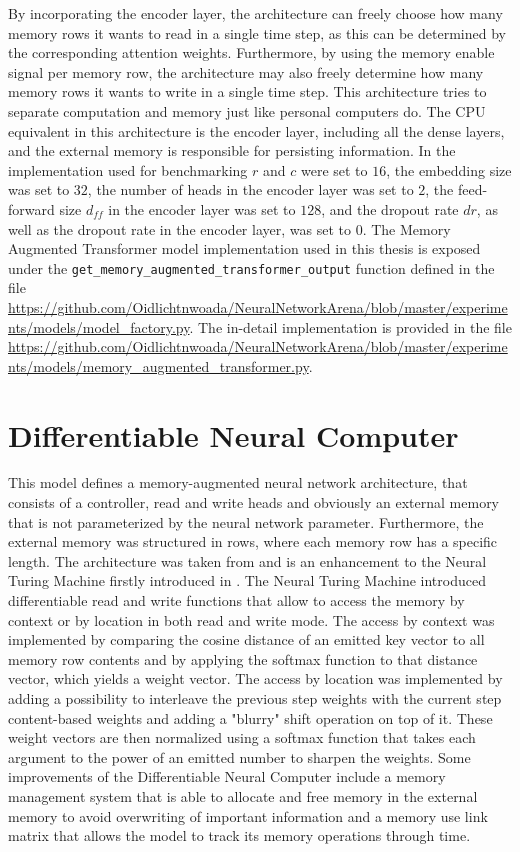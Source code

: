\documentclass[draft,final]{vutinfth} %
\begin{document}
    By incorporating the encoder layer, the architecture can freely choose how many memory rows it wants to read in a single time step, as this can be determined by the corresponding attention weights.
    Furthermore, by using the memory enable signal per memory row, the architecture may also freely determine how many memory rows it wants to write in a single time step.
    This architecture tries to separate computation and memory just like personal computers do. 
    The CPU equivalent in this architecture is the encoder layer, including all the dense layers, and the external memory is responsible for persisting information.
    In the implementation used for benchmarking $r$ and $c$ were set to $16$, the embedding size was set to $32$, the number of heads in the encoder layer was set to $2$,
    the feed-forward size $d_{ff}$ in the encoder layer was set to $128$, and the dropout rate $dr$, as well as the dropout rate in the encoder layer, was set to $0$.
    The Memory Augmented Transformer model implementation used in this thesis is exposed under the \texttt{get\_memory\_augmented\_transformer\_output} function defined in the file \url{https://github.com/Oidlichtnwoada/NeuralNetworkArena/blob/master/experiments/models/model_factory.py}.
    The in-detail implementation is provided in the file \url{https://github.com/Oidlichtnwoada/NeuralNetworkArena/blob/master/experiments/models/memory_augmented_transformer.py}.

    \section{Differentiable Neural Computer} \label{dnc}
    This model defines a memory-augmented neural network architecture, that consists of a controller, read and write heads and obviously an external memory that is not parameterized by the neural network parameter.
    Furthermore, the external memory was structured in rows, where each memory row has a specific length.
    The architecture was taken from \cite{DNC} and is an enhancement to the Neural Turing Machine firstly introduced in \cite{NTM}.
    The Neural Turing Machine introduced differentiable read and write functions that allow to access the memory by context or by location in both read and write mode.
    The access by context was implemented by comparing the cosine distance of an emitted key vector to all memory row contents and by applying the softmax function to that distance vector, which yields a weight vector.
    The access by location was implemented by adding a possibility to interleave the previous step weights with the current step content-based weights and adding a "blurry" shift operation on top of it.
    These weight vectors are then normalized using a softmax function that takes each argument to the power of an emitted number to sharpen the weights.
    Some improvements of the Differentiable Neural Computer include a memory management system that is able to allocate and free memory in the external memory to avoid overwriting of important information and a memory use link matrix that allows the model to track its memory operations through time.
\end{document}

